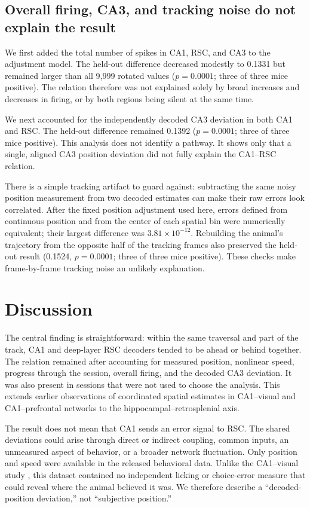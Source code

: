 \documentclass[10pt,twocolumn]{article}
\begin{document}
\subsection{Overall firing, CA3, and tracking noise do not explain the result}

We first added the total number of spikes in CA1, RSC, and CA3 to the adjustment model. The held-out difference decreased modestly to 0.1331 but remained larger than all 9,999 rotated values ($p=0.0001$; three of three mice positive). The relation therefore was not explained solely by broad increases and decreases in firing, or by both regions being silent at the same time.

We next accounted for the independently decoded CA3 deviation in both CA1 and RSC. The held-out difference remained 0.1392 ($p=0.0001$; three of three mice positive). This analysis does not identify a pathway. It shows only that a single, aligned CA3 position deviation did not fully explain the CA1--RSC relation.

There is a simple tracking artifact to guard against: subtracting the same noisy position measurement from two decoded estimates can make their raw errors look correlated. After the fixed position adjustment used here, errors defined from continuous position and from the center of each spatial bin were numerically equivalent; their largest difference was $3.81\times10^{-12}$. Rebuilding the animal's trajectory from the opposite half of the tracking frames also preserved the held-out result (0.1524, $p=0.0001$; three of three mice positive). These checks make frame-by-frame tracking noise an unlikely explanation.

\section{Discussion}

The central finding is straightforward: within the same traversal and part of the track, CA1 and deep-layer RSC decoders tended to be ahead or behind together. The relation remained after accounting for measured position, nonlinear speed, progress through the session, overall firing, and the decoded CA3 deviation. It was also present in sessions that were not used to choose the analysis. This extends earlier observations of coordinated spatial estimates in CA1--visual and CA1--prefrontal networks \citep{saleem2018,tang2019} to the hippocampal--retrosplenial axis.

The result does not mean that CA1 sends an error signal to RSC. The shared deviations could arise through direct or indirect coupling, common inputs, an unmeasured aspect of behavior, or a broader network fluctuation. Only position and speed were available in the released behavioral data. Unlike the CA1--visual study \citep{saleem2018}, this dataset contained no independent licking or choice-error measure that could reveal where the animal believed it was. We therefore describe a ``decoded-position deviation,'' not ``subjective position.''
\end{document}
